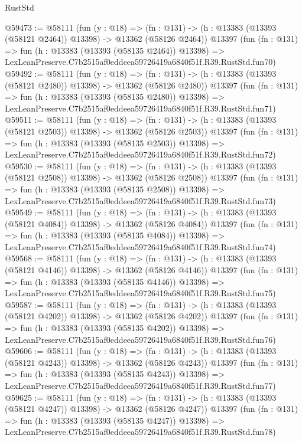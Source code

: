 \begin{lexlean}{RustStd}
\begin{coremodule}
@59473 := @58111
    (fun (y : @18) =>
    (fn : @131) -> (h : @13383 (@13393 (@58121 @2464)) @13398) -> @13362 (@58126 @2464))
    @13397
    (fun (fn : @131) =>
    fun (h : @13383 (@13393 (@58135 @2464)) @13398) =>
    LexLeanPreserve.C7b2515af0eddeea59726419a6840f51f.R39.RustStd.fun70)
@59492 := @58111
    (fun (y : @18) =>
    (fn : @131) -> (h : @13383 (@13393 (@58121 @2480)) @13398) -> @13362 (@58126 @2480))
    @13397
    (fun (fn : @131) =>
    fun (h : @13383 (@13393 (@58135 @2480)) @13398) =>
    LexLeanPreserve.C7b2515af0eddeea59726419a6840f51f.R39.RustStd.fun71)
@59511 := @58111
    (fun (y : @18) =>
    (fn : @131) -> (h : @13383 (@13393 (@58121 @2503)) @13398) -> @13362 (@58126 @2503))
    @13397
    (fun (fn : @131) =>
    fun (h : @13383 (@13393 (@58135 @2503)) @13398) =>
    LexLeanPreserve.C7b2515af0eddeea59726419a6840f51f.R39.RustStd.fun72)
@59530 := @58111
    (fun (y : @18) =>
    (fn : @131) -> (h : @13383 (@13393 (@58121 @2508)) @13398) -> @13362 (@58126 @2508))
    @13397
    (fun (fn : @131) =>
    fun (h : @13383 (@13393 (@58135 @2508)) @13398) =>
    LexLeanPreserve.C7b2515af0eddeea59726419a6840f51f.R39.RustStd.fun73)
@59549 := @58111
    (fun (y : @18) =>
    (fn : @131) -> (h : @13383 (@13393 (@58121 @4084)) @13398) -> @13362 (@58126 @4084))
    @13397
    (fun (fn : @131) =>
    fun (h : @13383 (@13393 (@58135 @4084)) @13398) =>
    LexLeanPreserve.C7b2515af0eddeea59726419a6840f51f.R39.RustStd.fun74)
@59568 := @58111
    (fun (y : @18) =>
    (fn : @131) -> (h : @13383 (@13393 (@58121 @4146)) @13398) -> @13362 (@58126 @4146))
    @13397
    (fun (fn : @131) =>
    fun (h : @13383 (@13393 (@58135 @4146)) @13398) =>
    LexLeanPreserve.C7b2515af0eddeea59726419a6840f51f.R39.RustStd.fun75)
@59587 := @58111
    (fun (y : @18) =>
    (fn : @131) -> (h : @13383 (@13393 (@58121 @4202)) @13398) -> @13362 (@58126 @4202))
    @13397
    (fun (fn : @131) =>
    fun (h : @13383 (@13393 (@58135 @4202)) @13398) =>
    LexLeanPreserve.C7b2515af0eddeea59726419a6840f51f.R39.RustStd.fun76)
@59606 := @58111
    (fun (y : @18) =>
    (fn : @131) -> (h : @13383 (@13393 (@58121 @4243)) @13398) -> @13362 (@58126 @4243))
    @13397
    (fun (fn : @131) =>
    fun (h : @13383 (@13393 (@58135 @4243)) @13398) =>
    LexLeanPreserve.C7b2515af0eddeea59726419a6840f51f.R39.RustStd.fun77)
@59625 := @58111
    (fun (y : @18) =>
    (fn : @131) -> (h : @13383 (@13393 (@58121 @4247)) @13398) -> @13362 (@58126 @4247))
    @13397
    (fun (fn : @131) =>
    fun (h : @13383 (@13393 (@58135 @4247)) @13398) =>
    LexLeanPreserve.C7b2515af0eddeea59726419a6840f51f.R39.RustStd.fun78)

\end{coremodule}
\end{lexlean}
